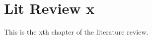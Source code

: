 \graphicspath{{main-matter/lit-review-x/resources/}}

\chapter{Lit Review x}\label{chap_lrx}

This is the xth chapter of the literature review.